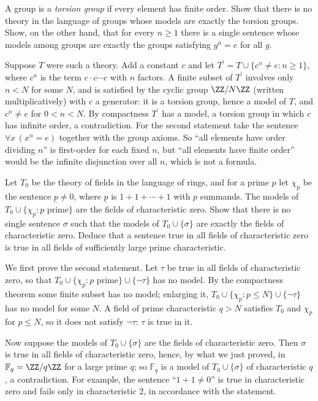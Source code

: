 \begin{exercise}\label{logic:exercise-torsion-groups}
A group is a \emph{torsion group} if every element has finite order. Show that
there is no theory in the language of groups whose models are exactly the
torsion groups. Show, on the other hand, that for every $n \geq 1$ there is a
single sentence whose models among groups are exactly the groups satisfying
$g^n = e$ for all $g$.
\end{exercise}

\begin{solution}
Suppose $T$ were such a theory. Add a constant $c$ and let $T^{\prime} = T \cup \{c^n \neq e : n \geq 1\}$, where $c^n$ is the term $c \cdot c \cdots c$ with $n$ factors. A finite subset of
$T^{\prime}$ involves only $n < N$ for some $N$, and is satisfied by the cyclic group $\ZZ/N\ZZ$ (written multiplicatively) with $c$ a generator: it is a torsion group, hence a model of
$T$, and $c^n \neq e$ for $0 < n < N$. By compactness $T^{\prime}$ has a model, a torsion group in which $c$ has infinite order, a contradiction. For the second statement take the
sentence $\forall x\,(x^n = e)$ together with the group axioms. So ``all elements have order dividing $n$'' is first-order for each fixed $n$, but ``all elements have finite
order'' would be the infinite disjunction over all $n$, which is not a formula.
\end{solution}

\begin{exercise}\label{logic:exercise-characteristic-zero}
Let $T_0$ be the theory of fields in the language of rings, and for a prime
$p$ let $\chi_p$ be the sentence $\underline{p} \neq 0$, where $\underline{p}$
is $1 + 1 + \cdots + 1$ with $p$ summands. The models of
$T_0 \cup \{\chi_p : p \text{ prime}\}$ are the fields of characteristic zero.
Show that there is no single sentence $\sigma$ such that the models of
$T_0 \cup \{\sigma\}$ are exactly the fields of characteristic zero. Deduce that
a sentence true in all fields of characteristic zero is true in all fields
of sufficiently large prime characteristic.
\end{exercise}

\begin{solution}
We first prove the second statement. Let $\tau$ be true in all fields of characteristic zero, so that $T_0 \cup \{\chi_p : p \text{ prime}\} \cup \{\neg\tau\}$ has no model. By the compactness
theorem some finite subset has no model; enlarging it, $T_0 \cup \{\chi_p : p \leq N\} \cup \{\neg\tau\}$ has no model for some $N$. A field of prime characteristic $q > N$ satisfies
$T_0$ and $\chi_p$ for $p \leq N$, so it does not satisfy $\neg\tau$: $\tau$ is true in it.

Now suppose the models of $T_0 \cup \{\sigma\}$ are the fields of characteristic zero. Then $\sigma$ is true in all fields of characteristic zero, hence, by what we just proved, in
$\mathbb{F}_q = \ZZ/q\ZZ$ for a large prime $q$; so $\mathbb{F}_q$ is a model of $T_0 \cup \{\sigma\}$ of characteristic $q$, a contradiction. For example, the sentence ``$1 + 1 \neq 0$'' is
true in characteristic zero and fails only in characteristic $2$, in accordance with the statement.
\end{solution}

